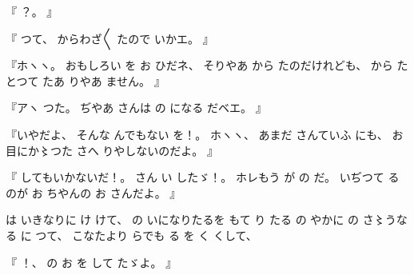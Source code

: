 %
『
？。
』

%
『
つて、
%
からわざ〳〵
たので
いかエ。
』

%
『ホヽヽ。
%
おもしろい
を
お
ひだネ、
%
そりやあ
から
たのだけれども、
%
から
たとつて
たあ
りやあ
ません。
』

%
『アヽ
つた。
%
ぢやあ
さんは
の
になる
だベエ。
』

%
『いやだよ、
%
そんな
んでもない
を！。
%
ホヽヽ、
%
あまだ
さんていふ
にも、
%
お目にか〻つた
さへ
りやしないのだよ。
』

%
『
してもいかないだ！。
%
さん
い
したゞ！。
%
ホレもう
が
の
だ。
%
いぢつて
るのが
お
ちやんの
お
さんだよ。
』

%
は
いきなりに
け
けて、
%
の
いになりたるを
もて
り
たる
の
やかに
の
さ〻うなる
に
つて、
%
こなたより
らでも
る
を
く
くして、

%
『
！、
%
の
お
を
して
たゞよ。
』

